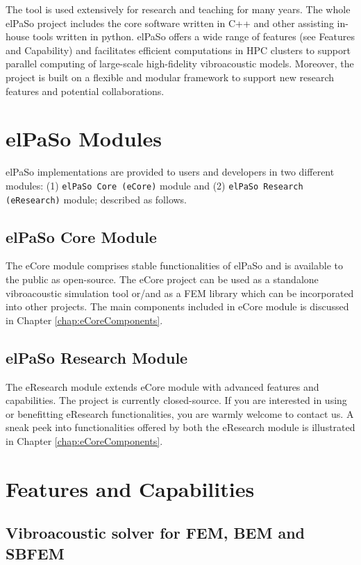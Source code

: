 The tool is used extensively for research and teaching for many years. The whole elPaSo project includes the core software written in C++ and other assisting in-house tools written in python. elPaSo offers a wide range of features (see Features and Capability) and facilitates efficient computations in HPC clusters to support parallel computing of large-scale high-fidelity vibroacoustic models. Moreover, the project is built on a flexible and modular framework to support new research features and potential collaborations.

\section{elPaSo Modules}
elPaSo implementations are provided to users and developers in two different modules: (1) \texttt{elPaSo Core (eCore)} module and (2) \texttt{elPaSo Research (eResearch)} module; described as follows.

\subsection{elPaSo Core Module}
The eCore module comprises stable functionalities of elPaSo and is available to the public as open-source. The eCore project can be used as a standalone vibroacoustic simulation tool or/and as a FEM library which can be incorporated into other projects. The main components included in eCore module is discussed in Chapter \ref{chap:eCoreComponents}.

\subsection{elPaSo Research Module}
The eResearch module extends eCore module with advanced features and capabilities. The project is currently closed-source. If you are interested in using or benefitting eResearch functionalities, you are warmly welcome to contact us. A sneak peek into functionalities offered by both the eResearch module is illustrated in Chapter \ref{chap:eCoreComponents}.

\section{Features and Capabilities}

\subsection{Vibroacoustic solver for FEM, BEM and SBFEM}

